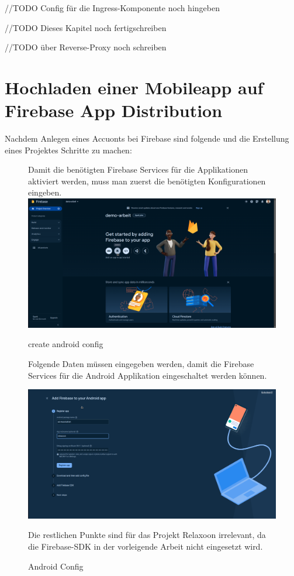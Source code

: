 //TODO Config für die Ingress-Komponente noch hingeben

//TODO Dieses Kapitel noch fertigschreiben



//TODO über Reverse-Proxy noch schreiben


\section{Hochladen einer Mobileapp auf Firebase App Distribution}

Nachdem Anlegen eines Accuonts bei Firebase sind folgende und die Erstellung eines Projektes Schritte zu machen:


\begin{figure}
  Damit die benötigten Firebase Services für die Applikationen aktiviert werden, muss man zuerst die benötigten Konfigurationen eingeben.
  \includegraphics[width=\textwidth]{./pics/firebase1.png}
  \caption{create android config}
\end{figure}



\begin{figure}
  Folgende Daten müssen eingegeben werden, damit die Firebase Services für die Android Applikation eingeschaltet werden können.

  \includegraphics[width=\textwidth]{./pics/firebase2.png}
  \caption{Android Config}
  Die restlichen Punkte sind für das Projekt Relaxoon irrelevant,
  da die Firebase-SDK in der vorleigende Arbeit nicht eingesetzt wird.
\end{figure}



